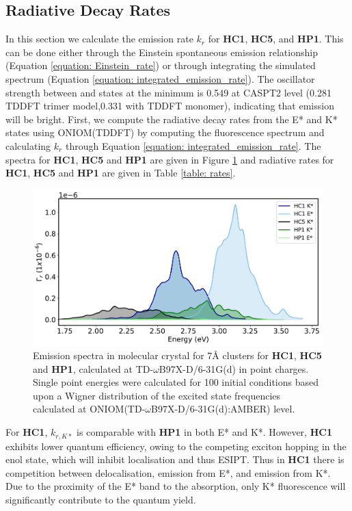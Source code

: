 \subsection{Radiative Decay Rates}\label{section: connecting_radiative_rates}
In this section we calculate the emission rate $k_{r}$ for \textbf{HC1}, \textbf{HC5}, and \textbf{HP1}. This can be done either through the Einstein spontaneous emission relationship (Equation \ref{equation: Einstein_rate}) or through integrating the simulated spectrum (Equation \ref{equation: integrated_emission_rate}). The oscillator strength between \sone{} and \szero{} states at the \Kstar{} minimum is 0.549 at CASPT2 level (0.281 TDDFT trimer model,0.331 with TDDFT monomer), indicating that emission will be bright. First, we compute the radiative decay rates from the E* and K* states using ONIOM(TDDFT) by computing the fluorescence spectrum and calculating $k_{r}$ through Equation \ref{equation: integrated_emission_rate}. The spectra for \textbf{HC1}, \textbf{HC5} and \textbf{HP1} are given in Figure \ref{figure: HC1_HC5_HP1_emission_oniom} and radiative rates for \textbf{HC1}, \textbf{HC5} and \textbf{HP1} are given in Table \ref{table: rates}.

\begin{figure}[t]
\centering
\includegraphics[width=0.8\linewidth]{5ConnectingCrystalStructure/HC1_HC5_HP1_emission_oniom}
\caption[Emission spectra in molecular crystal for 7\AA{} clusters for \textbf{HC1}, \textbf{HC5} and \textbf{HP1}]{Emission spectra in molecular crystal for 7\AA{} clusters for \textbf{HC1}, \textbf{HC5} and \textbf{HP1}, calculated at TD-$\omega$B97X-D/6-31G(d) in point charges. Single point energies were calculated for 100 initial conditions based upon a Wigner distribution of the excited state frequencies calculated at ONIOM(TD-$\omega$B97X-D/6-31G(d):AMBER) level.}
\label{figure: HC1_HC5_HP1_emission_oniom}
\end{figure}

For \textbf{HC1}, $k_{r,K*}$ is comparable with \textbf{HP1} in both E* and K*. However, \textbf{HC1} exhibits lower quantum efficiency, owing to the competing exciton hopping in the enol state, which will inhibit localisation and thus ESIPT. Thus in \textbf{HC1} there is competition between delocalisation, emission from E*, and emission from K*. Due to the proximity of the E* band to the absorption, only K* fluorescence will significantly contribute to the quantum yield.


